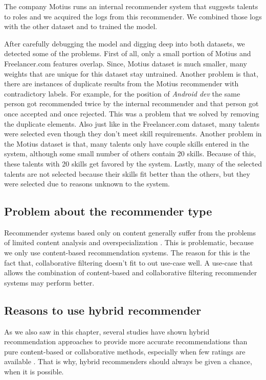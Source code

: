 The company Motius runs an internal recommender system that suggests talents to roles and we acquired the logs from this recommender. We combined those logs with the other dataset and to trained the model.

After carefully debugging the model and digging deep into both datasets, we detected some of the problems. First of all, only a small portion of Motius and Freelancer.com features overlap. Since, Motius dataset is much smaller, many weights that are unique for this dataset stay untrained. Another problem is that, there are instances of duplicate results from the Motius recommender with contradictory labels. For example, for the position of \textit{Android dev} the same person got recommended twice by the internal recommender and that person got once accepted and once rejected. This was a problem that we solved by removing the duplicate elements. Also just like in the Freelancer.com dataset, many talents were selected even though they don't meet skill requirements. Another problem in the Motius dataset is that, many talents only have couple skills entered in the system, although some small number of others contain 20 skills. Because of this, these talents with 20 skills get favored by the system. Lastly,  many of the selected talents are not selected because their skills fit better than the others, but they were selected due to reasons unknown to the system.

\subsection{Problem about the recommender type}

Recommender systems based only on content generally suffer from the problems of limited content analysis and overspecialization \cite{shardanand1995social}. This is problematic, because we only use content-based recommendation systems. The reason for this is the fact that, collaborative filtering doesn't fit to out use-case well. A use-case that allows the combination of content-based and collaborative filtering recommender systems may perform better.

\subsection{Reasons to use hybrid recommender}

As we also saw in this chapter, several studies have shown hybrid recommendation approaches to provide more accurate recommendations than pure content-based or collaborative methods, especially when few ratings are available \cite{adomavicius2005toward}. That is why, hybrid recommenders should always be given a chance, when it is possible.


